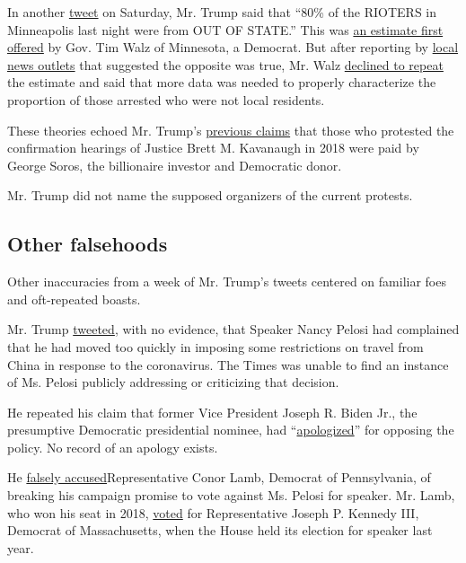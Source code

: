 In another
\href{https://twitter.com/realDonaldTrump/status/1266800113260703744}{tweet}
on Saturday, Mr. Trump said that ``80\% of the RIOTERS in Minneapolis
last night were from OUT OF STATE.'' This was
\href{https://www.youtube.com/watch?v=jla3cyeuOI0}{an estimate first
offered} by Gov. Tim Walz of Minnesota, a Democrat. But after reporting
by
\href{https://www.twincities.com/2020/05/30/majority-of-those-arrested-in-connection-with-protests-riots-from-minnesota/}{local}
\href{https://www.kare11.com/article/news/investigations/kare-11-investigates-records-show-arrests-mostly-minnesotans-as-george-floyd-protests-riots-continue-minneapolis-st-paul/89-73f3e0e8-0664-41d5-8d3e-4467d04da7cb}{news
outlets} that suggested the opposite was true, Mr. Walz
\href{https://youtu.be/zkpOYn4J0nw?t=1387}{declined to repeat} the
estimate and said that more data was needed to properly characterize the
proportion of those arrested who were not local residents.

These theories echoed Mr. Trump's
\href{https://twitter.com/realDonaldTrump/status/1048196883464818688}{previous
claims} that those who protested the confirmation hearings of Justice
Brett M. Kavanaugh in 2018 were paid by George Soros, the billionaire
investor and Democratic donor.

Mr. Trump did not name the supposed organizers of the current protests.

\hypertarget{other-falsehoods}{%
\subsection{Other falsehoods}\label{other-falsehoods}}

Other inaccuracies from a week of Mr. Trump's tweets centered on
familiar foes and oft-repeated boasts.

Mr. Trump
\href{https://twitter.com/realDonaldTrump/status/1265301261903106054}{tweeted},
with no evidence, that Speaker Nancy Pelosi had complained that he had
moved too quickly in imposing some restrictions on travel from China in
response to the coronavirus. The Times was unable to find an instance of
Ms. Pelosi publicly addressing or criticizing that decision.

He repeated his claim that former Vice President Joseph R. Biden Jr.,
the presumptive Democratic presidential nominee, had
``\href{https://twitter.com/realDonaldTrump/status/1265009852516110336}{apologized}''
for opposing the policy. No record of an apology exists.

He
\href{https://twitter.com/realDonaldTrump/status/1265257673039249408}{falsely
accused}Representative Conor Lamb, Democrat of Pennsylvania, of breaking
his campaign promise to vote against Ms. Pelosi for speaker. Mr. Lamb,
who won his seat in 2018,
\href{http://clerk.house.gov/evs/2019/roll002.xml\#Kennedy}{voted} for
Representative Joseph P. Kennedy III, Democrat of Massachusetts, when
the House held its election for speaker last year.

